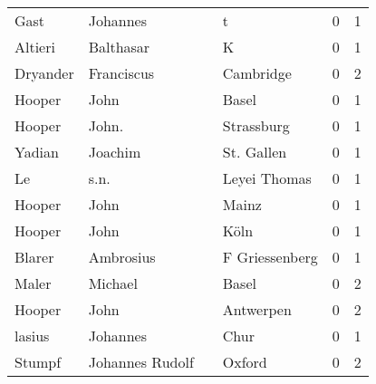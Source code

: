 \begin{center}
\begin{tiny}
\begin{longtabu}{llllrr}
                     Gast &                           Johannes &             &                                           t &          0 &         1 \\
                  Altieri &                          Balthasar &             &                                           K &          0 &         1 \\
                 Dryander &                         Franciscus &             &                                   Cambridge &          0 &         2 \\
                   Hooper &                               John &             &                                       Basel &          0 &         1 \\
                   Hooper &                              John. &             &                                  Strassburg &          0 &         1 \\
                   Yadian &                            Joachim &             &                                  St. Gallen &          0 &         1 \\
                       Le &                               s.n. &             &                                Leyei Thomas &          0 &         1 \\
                   Hooper &                               John &             &                                       Mainz &          0 &         1 \\
                   Hooper &                               John &             &                                        Köln &          0 &         1 \\
                   Blarer &                          Ambrosius &             &                              F Griessenberg &          0 &         1 \\
                    Maler &                            Michael &             &                                       Basel &          0 &         2 \\
                   Hooper &                               John &             &                                   Antwerpen &          0 &         2 \\
                   lasius &                           Johannes &             &                                        Chur &          0 &         1 \\
                   Stumpf &                    Johannes Rudolf &             &                                      Oxford &          0 &         2 \\

\end{longtabu}
\end{tiny}
\end{center}

